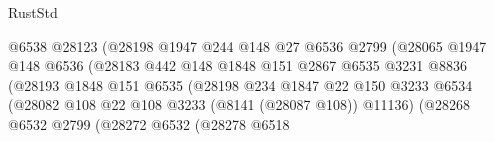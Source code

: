 \begin{lexlean}{RustStd}
\begin{coremodule}
                                          @6538
                                          @28123
                                          (@28198
                                            @1947
                                            @244
                                            @148
                                            @27
                                            @6536
                                            @2799
                                            (@28065
                                              @1947
                                              @148
                                              @6536
                                              (@28183
                                                @442
                                                @148
                                                @1848
                                                @151
                                                @2867
                                                @6535
                                                @3231
                                                @8836
                                                (@28193
                                                  @1848
                                                  @151
                                                  @6535
                                                  (@28198
                                                    @234
                                                    @1847
                                                    @22
                                                    @150
                                                    @3233
                                                    @6534
                                                    (@28082
                                                      @108
                                                      @22
                                                      @108
                                                      @3233
                                                      (@8141 (@28087 @108))
                                                      @11136)
                                                    (@28268
                                                      @6532
                                                      @2799
                                                      (@28272
                                                        @6532
                                                        (@28278
                                                          @6518

\end{coremodule}
\end{lexlean}
